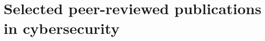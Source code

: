 \documentclass[11pt]{article}
\begin{document}
    \maketitle
    \setcounter{section}{4}
    \section{Selected peer-reviewed publications in cybersecurity}

    \makeatletter
    
    \newcommand\citeone[2][]{{%
        
        \renewenvironment{thebibliography}[1]{\renewcommand\bibitem[2][]{\if@filesw \immediate\write\@auxout{\string\bibcite{####2}{}}\fi\ignorespaces{#1}}}{}
        \begin{bibunit}[abbrv]\nocite{#2}\putbib[megabib]%
        \end{bibunit}%
    }}
    \newcommand\forperson[1]{%
      \subsection{#1}%
    }%
\end{document}
